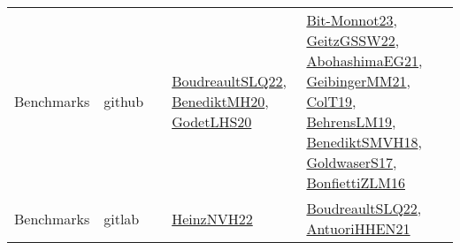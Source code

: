 {\begin{longtable}{lp{3cm}>{\raggedright}p{6cm}>{\raggedright}p{6cm}p{8cm}}
Benchmarks & github &  & \href{papers/BoudreaultSLQ22.pdf}{BoudreaultSLQ22}\cite{BoudreaultSLQ22}, \href{articles/BenediktMH20.pdf}{BenediktMH20}\cite{BenediktMH20}, \href{papers/GodetLHS20.pdf}{GodetLHS20}\cite{GodetLHS20} & \href{papers/Bit-Monnot23.pdf}{Bit-Monnot23}\cite{Bit-Monnot23}, \href{papers/GeitzGSSW22.pdf}{GeitzGSSW22}\cite{GeitzGSSW22}, \href{articles/AbohashimaEG21.pdf}{AbohashimaEG21}\cite{AbohashimaEG21}, \href{papers/GeibingerMM21.pdf}{GeibingerMM21}\cite{GeibingerMM21}, \href{papers/ColT19.pdf}{ColT19}\cite{ColT19}, \href{papers/BehrensLM19.pdf}{BehrensLM19}\cite{BehrensLM19}, \href{papers/BenediktSMVH18.pdf}{BenediktSMVH18}\cite{BenediktSMVH18}, \href{papers/GoldwaserS17.pdf}{GoldwaserS17}\cite{GoldwaserS17}, \href{papers/BonfiettiZLM16.pdf}{BonfiettiZLM16}\cite{BonfiettiZLM16}\\
Benchmarks & gitlab &  & \href{articles/HeinzNVH22.pdf}{HeinzNVH22}\cite{HeinzNVH22} & \href{papers/BoudreaultSLQ22.pdf}{BoudreaultSLQ22}\cite{BoudreaultSLQ22}, \href{papers/AntuoriHHEN21.pdf}{AntuoriHHEN21}\cite{AntuoriHHEN21}\\

\end{longtable}}
